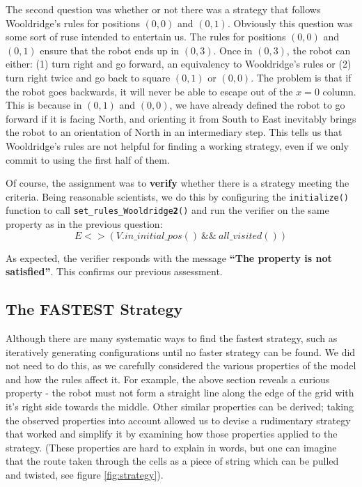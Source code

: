 \documentclass{article}
\begin{document}
The second question was whether or not there was a strategy that follows Wooldridge's rules for positions $(0,0)$ and $(0,1)$.
Obviously this question was some sort of ruse intended to entertain us.
The rules for positions $(0,0)$ and $(0,1)$ ensure that the robot ends up in $(0,3)$.
Once in $(0,3)$, the robot can either: (1) turn right and go forward, an equivalency to Wooldridge's rules
or (2) turn right twice and go back to square $(0,1)$ or $(0,0)$.
The problem is that if the robot goes backwards, it will never be able to escape out of the $x=0$ column.
This is because in $(0,1)$ and $(0,0)$, we have already defined the robot to go forward if it is facing North, and orienting it from South to East inevitably brings the robot to an orientation of North in an intermediary step.
This tells us that Wooldridge's rules are not helpful for finding a working strategy, even if we only commit to using the first half of them.

Of course, the assignment was to \textbf{verify} whether there is a strategy meeting the criteria.
Being reasonable scientists, we do this by configuring the \texttt{initialize()} function to call \texttt{set\_rules\_Wooldridge\textbf{2}()} and run the verifier on the same property as in the previous question:
\[ E<>(V.in\_initial\_pos() ~ \&\& ~ all\_visited()) \]

As expected, the verifier responds with the message \textbf{``The property is not satisfied''}.
This confirms our previous assessment.

\subsection{The FASTEST Strategy}

Although there are many systematic ways to find the fastest strategy, such as iteratively generating configurations until no faster strategy can be found.
We did not need to do this, as we carefully considered the various properties of the model and how the rules affect it.
For example, the above section reveals a curious property \-- the robot must not form a straight line along the edge of the grid with it's right side towards the middle.
Other similar properties can be derived; taking the observed properties into account allowed us to devise a rudimentary strategy that worked and simplify it by examining how those properties applied to the strategy. 
(These properties are hard to explain in words, but one can imagine that the route taken through the cells as a piece of string which can be pulled and twisted, see figure \ref{fig:strategy}).
\end{document}
